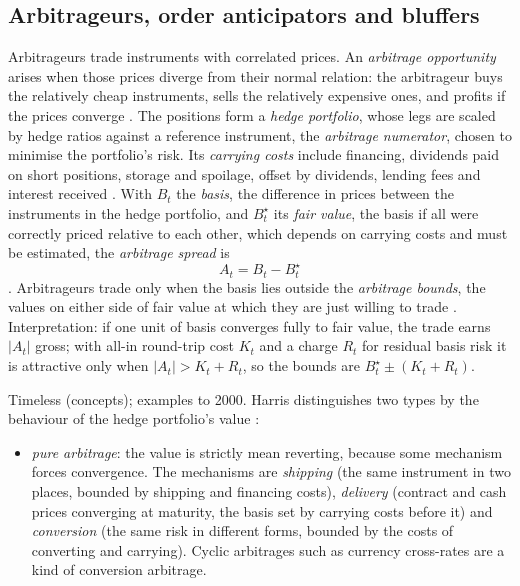 \subsection{Arbitrageurs, order anticipators and bluffers}

\begin{qfdefinition}\label{def:arbitrage}
 Arbitrageurs trade instruments with correlated prices. An \emph{arbitrage opportunity} arises when those prices diverge from their normal relation: the arbitrageur buys the relatively cheap instruments, sells the relatively expensive ones, and profits if the prices converge \citep[chap.~``Arbitrageurs'', sec.~17.1, p.~348]{alpha-harris}. The positions form a \emph{hedge portfolio}, whose legs are scaled by hedge ratios against a reference instrument, the \emph{arbitrage numerator}, chosen to minimise the portfolio's risk. Its \emph{carrying costs} include financing, dividends paid on short positions, storage and spoilage, offset by dividends, lending fees and interest received \citep[same sec., pp.~348--349]{alpha-harris}. With $B_t$ the \emph{basis}, the difference in prices between the instruments in the hedge portfolio, and $B_t^\star$ its \emph{fair value}, the basis if all were correctly priced relative to each other, which depends on carrying costs and must be estimated, the \emph{arbitrage spread} is
\[ A_t=B_t-B_t^\star \]
\citep[same sec., p.~349]{alpha-harris}. Arbitrageurs trade only when the basis lies outside the \emph{arbitrage bounds}, the values on either side of fair value at which they are just willing to trade \citep[same sec., p.~349]{alpha-harris}. Interpretation: if one unit of basis converges fully to fair value, the trade earns $|A_t|$ gross; with all-in round-trip cost $K_t$ and a charge $R_t$ for residual basis risk it is attractive only when $|A_t|>K_t+R_t$, so the bounds are $B_t^\star\pm(K_t+R_t)$.

 Timeless (concepts); examples to 2000. Harris distinguishes two types by the behaviour of the hedge portfolio's value \citep[same chap., sec.~17.3, pp.~350--363]{alpha-harris}:
\begin{itemize}
\item \emph{pure arbitrage}: the value is strictly mean reverting, because some mechanism forces convergence. The mechanisms are \emph{shipping} (the same instrument in two places, bounded by shipping and financing costs), \emph{delivery} (contract and cash prices converging at maturity, the basis set by carrying costs before it) and \emph{conversion} (the same risk in different forms, bounded by the costs of converting and carrying). Cyclic arbitrages such as currency cross-rates are a kind of conversion arbitrage.


\end{itemize}
\end{qfdefinition}
